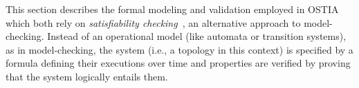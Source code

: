 




This section describes the formal modeling and validation employed in OSTIA  which both rely on \textit{satisfiability checking}~\cite{MPS13}, an alternative approach to model-checking.
Instead of an operational model (like automata or transition systems), as in model-checking, 
the system (i.e., a topology in this context) is specified by a formula defining their executions over time and properties are verified by proving that the system logically entails them.

